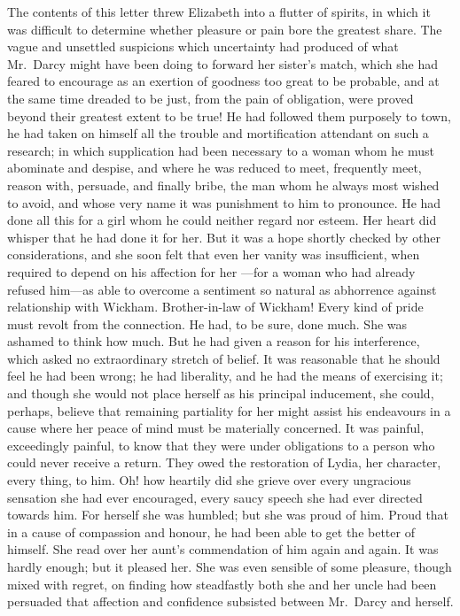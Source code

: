 The contents of this letter threw Elizabeth into a flutter
of spirits, in which it was difficult to determine whether
pleasure or pain bore the greatest share.  The vague and
unsettled suspicions which uncertainty had produced of what
Mr.\ Darcy might have been doing to forward her sister's match,
which she had feared to encourage as an exertion of goodness
too great to be probable, and at the same time dreaded to be
just, from the pain of obligation, were proved beyond their
greatest extent to be true!  He had followed them purposely to
town, he had taken on himself all the trouble and mortification
attendant on such a research; in which supplication had been
necessary to a woman whom he must abominate and despise, and
where he was reduced to meet, frequently meet, reason with,
persuade, and finally bribe, the man whom he always most wished
to avoid, and whose very name it was punishment to him to
pronounce.  He had done all this for a girl whom he could
neither regard nor esteem.  Her heart did whisper that he had
done it for her.  But it was a hope shortly checked by other
considerations, and she soon felt that even her vanity was
insufficient, when required to depend on his affection for her
---for a woman who had already refused him---as able to overcome
a sentiment so natural as abhorrence against relationship with
Wickham.  Brother-in-law of Wickham!  Every kind of pride must
revolt from the connection.  He had, to be sure, done much.
She was ashamed to think how much.  But he had given a reason
for his interference, which asked no extraordinary stretch of
belief.  It was reasonable that he should feel he had been wrong;
he had liberality, and he had the means of exercising it; and
though she would not place herself as his principal inducement,
she could, perhaps, believe that remaining partiality for her
might assist his endeavours in a cause where her peace of mind
must be materially concerned.  It was painful, exceedingly
painful, to know that they were under obligations to a person
who could never receive a return.  They owed the restoration of
Lydia, her character, every thing, to him.  Oh! how heartily
did she grieve over every ungracious sensation she had ever
encouraged, every saucy speech she had ever directed towards him.
For herself she was humbled; but she was proud of him.  Proud
that in a cause of compassion and honour, he had been able to get
the better of himself.  She read over her aunt's commendation
of him again and again.  It was hardly enough; but it pleased
her.  She was even sensible of some pleasure, though mixed with
regret, on finding how steadfastly both she and her uncle had
been persuaded that affection and confidence subsisted between
Mr.\ Darcy and herself.

